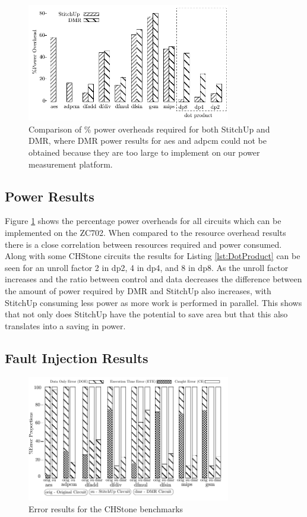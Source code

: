 \begin{figure}[t]
\centering
\includegraphics[width=3.5in]{./graphs/power_results.pdf}
\caption{Comparison of \% power overheads required for both StitchUp and DMR, where DMR power results for aes and adpcm could
not be obtained because they are too large to implement on our power measurement platform.}
\label{fig:power_res}
\end{figure}

\subsection{Power Results}
Figure \ref{fig:power_res} shows the percentage power overheads for all circuits which can be implemented on the ZC702.
When compared to the resource overhead results there is a close correlation between resources required and power consumed.
Along with some CHStone circuits the results for Listing \ref{lst:DotProduct} can be seen for an unroll factor 2 in dp2, 4 in dp4,
and 8 in dp8.
As the unroll factor increases and the ratio between control and data decreases the difference between the amount of power required by DMR and StitchUp also
increases, with StitchUp consuming less power as more work is performed in parallel.
This shows that not only does StitchUp have the potential to save area but that this also translates into a
saving in power.

\subsection{Fault Injection Results}

\begin{figure}[t]
\centering
\includegraphics[width=3.5in]{./graphs/errors_res_corrected.pdf}
\caption{Error results for the CHStone benchmarks}
\label{fig:error_res}
\end{figure}

